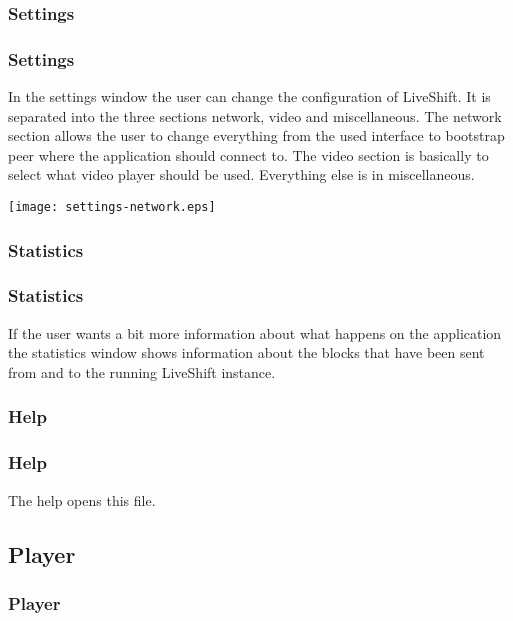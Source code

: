 \documentclass{beamer}
\begin{document}
\subsubsection{Settings}
\frame
{
\frametitle{Settings}
In the settings window the user can change the configuration of LiveShift. It is separated into the three sections network, video and miscellaneous.\linebreak
The network section allows the user to change everything from the used interface to bootstrap peer where the application should connect to.\linebreak
The video section is basically to select what video player should be used.\linebreak
Everything else is in miscellaneous.
\begin{center}
\texttt{[image: settings-network.eps]}
\end{center}
}

\subsubsection{Statistics}
\frame
{
\frametitle{Statistics}
If the user wants a bit more information about what happens on the application the statistics window shows information about the blocks that have been sent from and to the running LiveShift instance.
}

\subsubsection{Help}
\frame
{
\frametitle{Help}
The help opens this file.
}

\subsection{Player}
\frame
{
\frametitle{Player}
}
\end{document}
